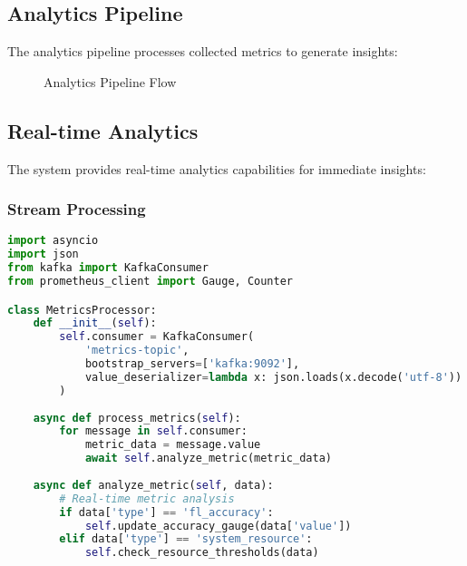 \subsection{Analytics Pipeline}

The analytics pipeline processes collected metrics to generate insights:

\begin{figure}[htbp]
\centering
{}
\caption{Analytics Pipeline Flow}
\label{fig:analytics-pipeline}
\end{figure}

\subsection{Real-time Analytics}

The system provides real-time analytics capabilities for immediate insights:

\subsubsection{Stream Processing}
\begin{lstlisting}[language=python, caption=Stream Processing Implementation]
import asyncio
import json
from kafka import KafkaConsumer
from prometheus_client import Gauge, Counter

class MetricsProcessor:
    def __init__(self):
        self.consumer = KafkaConsumer(
            'metrics-topic',
            bootstrap_servers=['kafka:9092'],
            value_deserializer=lambda x: json.loads(x.decode('utf-8'))
        )
        
    async def process_metrics(self):
        for message in self.consumer:
            metric_data = message.value
            await self.analyze_metric(metric_data)
            
    async def analyze_metric(self, data):
        # Real-time metric analysis
        if data['type'] == 'fl_accuracy':
            self.update_accuracy_gauge(data['value'])
        elif data['type'] == 'system_resource':
            self.check_resource_thresholds(data)
\end{lstlisting}

